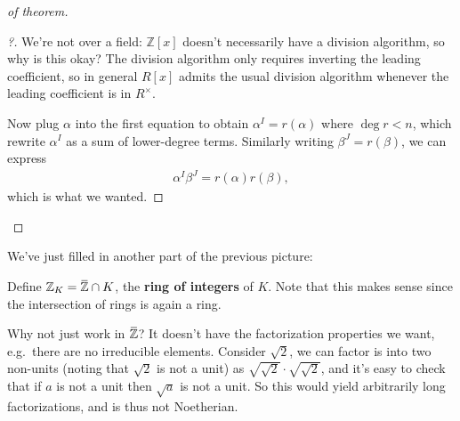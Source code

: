 \begin{proof}[of theorem]
\begin{proof}[?]
We're not over a field: \({\mathbb{Z}}[x]\) doesn't necessarily have a
division algorithm, so why is this okay? The division algorithm only
requires inverting the leading coefficient, so in general \(R[x]\)
admits the usual division algorithm whenever the leading coefficient is
in \(R^{\times}\).

Now plug \(\alpha\) into the first equation to obtain
\(\alpha^I = r(\alpha)\) where \(\deg r < n\), which rewrite
\(\alpha^I\) as a sum of lower-degree terms. Similarly writing
\(\beta^J = r(\beta)\), we can express
\begin{align*}
\alpha^I \beta^J = r(\alpha) r(\beta)
,\end{align*}
which is what we wanted.

\end{proof}

\end{proof}

\begin{remark}

We've just filled in another part of the previous picture:

\begin{center}
\end{center}

\end{remark}

\begin{definition}

Define
\({\mathbb{Z}}_K = \mkern 1.5mu\overline{\mkern-1.5mu{\mathbb{Z}}\mkern-1.5mu}\mkern 1.5mu\cap K\),
the \textbf{ring of integers} of \(K\). Note that this makes sense since
the intersection of rings is again a ring.

\end{definition}

\begin{remark}

Why not just work in
\(\mkern 1.5mu\overline{\mkern-1.5mu{\mathbb{Z}}\mkern-1.5mu}\mkern 1.5mu\)?
It doesn't have the factorization properties we want, e.g.~there are no
irreducible elements. Consider \(\sqrt 2\), we can factor is into two
non-units (noting that \(\sqrt 2\) is not a unit) as
\(\sqrt{\sqrt 2} \cdot \sqrt{\sqrt 2}\), and it's easy to check that if
\(a\) is not a unit then \(\sqrt a\) is not a unit. So this would yield
arbitrarily long factorizations, and is thus not Noetherian.

\end{remark}


